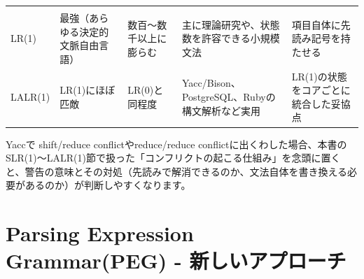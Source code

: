 \begin{longtable}[]{@{}lllll@{}}
\begin{minipage}[t]{0.17\columnwidth}
\end{minipage}\tabularnewline
\begin{minipage}[t]{0.17\columnwidth}\raggedright
LR(1)\strut
\end{minipage} & \begin{minipage}[t]{0.17\columnwidth}\raggedright
最強（あらゆる決定的文脈自由言語）\strut
\end{minipage} & \begin{minipage}[t]{0.17\columnwidth}\raggedright
数百〜数千以上に膨らむ\strut
\end{minipage} & \begin{minipage}[t]{0.17\columnwidth}\raggedright
主に理論研究や、状態数を許容できる小規模文法\strut
\end{minipage} & \begin{minipage}[t]{0.17\columnwidth}\raggedright
項目自体に先読み記号を持たせる\strut
\end{minipage}\tabularnewline
\begin{minipage}[t]{0.17\columnwidth}\raggedright
LALR(1)\strut
\end{minipage} & \begin{minipage}[t]{0.17\columnwidth}\raggedright
LR(1)にほぼ匹敵\strut
\end{minipage} & \begin{minipage}[t]{0.17\columnwidth}\raggedright
LR(0)と同程度\strut
\end{minipage} & \begin{minipage}[t]{0.17\columnwidth}\raggedright
Yacc/Bison、PostgreSQL、Rubyの構文解析など実用\strut
\end{minipage} & \begin{minipage}[t]{0.17\columnwidth}\raggedright
LR(1)の状態をコアごとに統合した妥協点\strut
\end{minipage}\tabularnewline
\bottomrule
\end{longtable}

Yaccで shift/reduce conflictやreduce/reduce
conflictに出くわした場合、本書のSLR(1)〜LALR(1)節で扱った「コンフリクトの起こる仕組み」を念頭に置くと、警告の意味とその対処（先読みで解消できるのか、文法自体を書き換える必要があるのか）が判断しやすくなります。

\hypertarget{chapter5-parsing-expression-grammarpeg---ux65b0ux3057ux3044ux30a2ux30d7ux30edux30fcux30c1}{%
\section{Parsing Expression Grammar(PEG) -
新しいアプローチ}\label{chapter5-parsing-expression-grammarpeg---ux65b0ux3057ux3044ux30a2ux30d7ux30edux30fcux30c1}}

